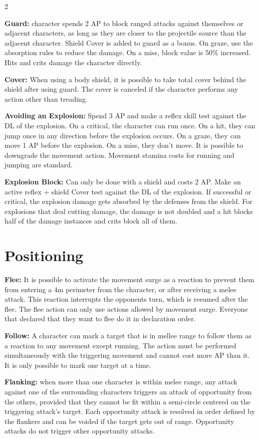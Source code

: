\begin{multicols}{2}
{\textbf{Guard:} character spends 2 AP to block ranged attacks against themselves or adjacent characters, as long as they are closer to the projectile source than the adjacent character. Shield Cover is added to guard as a bonus. On graze, use the absorption rules to reduce the damage. On a miss, block value is 50\% increased. Hits and crits damage the character directly.

\textbf{Cover:} When using a body shield, it is possible to take total cover behind the shield after using guard. The cover is canceled if the character performs any action other than treading. 

\textbf{Avoiding an Explosion:} Spend 3 AP and make a reflex skill test against the DL of the explosion. On a critical, the character can run once. On a hit, they can jump once in any direction before the explosion occurs. On a graze, they can move 1 AP before the explosion. On a miss, they don't move. It is possible to downgrade the movement action. Movement stamina costs for running and jumping are standard.

\textbf{Explosion Block:} Can only be done with a shield and costs 2 AP. Make an active reflex + shield Cover test against the DL of the explosion. If successful or critical, the explosion damage gets absorbed by the defenses from the shield. For explosions that deal cutting damage, the damage is not doubled and a hit blocks half of the damage instances and crits block all of them.
}

\section{Positioning }

\textbf{Flee:} It is possible to activate the movement surge as a reaction to prevent them from entering a 4m perimeter from the character, or after receiving a melee attack. This reaction interrupts the opponents turn, which is resumed after the flee. The flee action can only use actions allowed by movement surge. Everyone that declared that they want to flee do it in declaration order.

\textbf{Follow:} A character can mark a target that is in mellee range to follow them as a reaction to any movement except running. The action must be performed simultaneously with the triggering movement and cannot cost more AP than it. It is only possible to mark one target at a time.

\textbf{Flanking:} when more than one character is within melee range, any attack against one of the surrounding characters triggers an attack of opportunity from the others, provided that they cannot be fit within a semi-circle centered on the triggering attack's target. Each opportunity attack is resolved in order defined by the flankers and can be voided if the target gets out of range. Opportunity attacks do not trigger other opportunity attacks.


\end{multicols}
